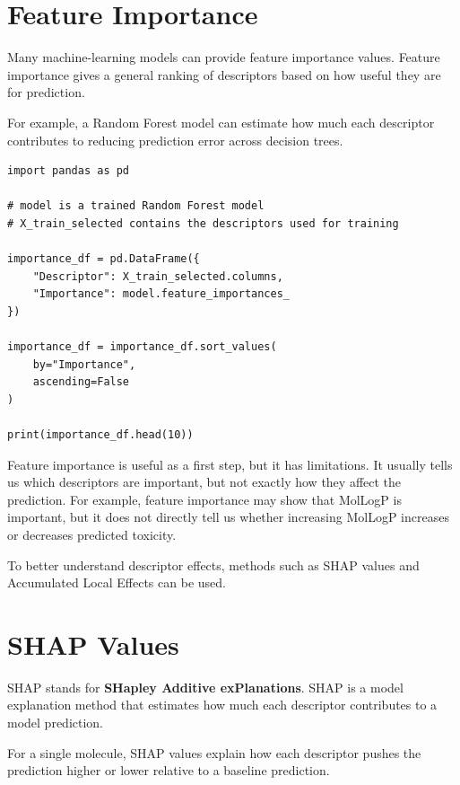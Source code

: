 \documentclass[11pt]{report}
\newenvironment{Important note}{\begin{quote}\color{red}\textbf{Important note:} }{\end{quote}}
\begin{document}
\section{Feature Importance}

Many machine-learning models can provide feature importance values. Feature importance gives a general ranking of descriptors based on how useful they are for prediction.

For example, a Random Forest model can estimate how much each descriptor contributes to reducing prediction error across decision trees.

\begin{lstlisting}[style=pythonstyle, caption={Extracting feature importance from a Random Forest model.}]
import pandas as pd

# model is a trained Random Forest model
# X_train_selected contains the descriptors used for training

importance_df = pd.DataFrame({
    "Descriptor": X_train_selected.columns,
    "Importance": model.feature_importances_
})

importance_df = importance_df.sort_values(
    by="Importance",
    ascending=False
)

print(importance_df.head(10))
\end{lstlisting}

Feature importance is useful as a first step, but it has limitations. It usually tells us which descriptors are important, but not exactly how they affect the prediction. For example, feature importance may show that MolLogP is important, but it does not directly tell us whether increasing MolLogP increases or decreases predicted toxicity.

To better understand descriptor effects, methods such as SHAP values and Accumulated Local Effects can be used.

\section{SHAP Values}

SHAP stands for \textbf{SHapley Additive exPlanations}. SHAP is a model explanation method that estimates how much each descriptor contributes to a model prediction.

For a single molecule, SHAP values explain how each descriptor pushes the prediction higher or lower relative to a baseline prediction.
\end{document}
